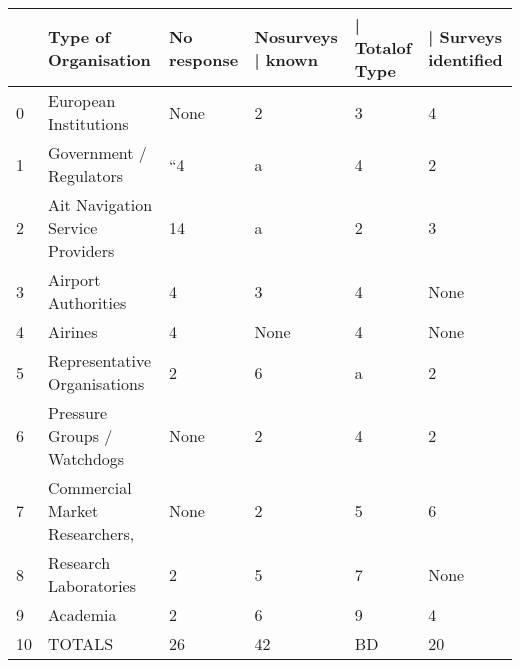 \begin{tabular}{llllll}
\toprule
{} &              Type of Organisation & No response & Nosurveys | known & | Totalof Type & | Surveys identified \\
\midrule
0  &             European Institutions &        None &                 2 &              3 &                    4 \\
1  &           Government / Regulators &          “4 &                 a &              4 &                    2 \\
2  &  Ait Navigation Service Providers &          14 &                 a &              2 &                    3 \\
3  &               Airport Authorities &           4 &                 3 &              4 &                 None \\
4  &                           Airines &           4 &              None &              4 &                 None \\
5  &      Representative Organisations &           2 &                 6 &              a &                    2 \\
6  &       Pressure Groups / Watchdogs &        None &                 2 &              4 &                    2 \\
7  &    Commercial Market Researchers, &        None &                 2 &              5 &                    6 \\
8  &             Research Laboratories &           2 &                 5 &              7 &                 None \\
9  &                          Academia &           2 &                 6 &              9 &                    4 \\
10 &                            TOTALS &          26 &                42 &             BD &                   20 \\
\bottomrule
\end{tabular}
